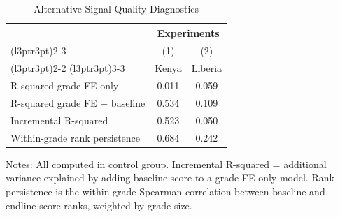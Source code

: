 \begin{table}[H]
\centering
\caption{Alternative Signal-Quality Diagnostics}
\label{tab:signal_quality_alt}
\begin{threeparttable}
\begin{tabular}[t]{lcc}
\toprule
\multicolumn{1}{c}{ } & \multicolumn{2}{c}{Experiments} \\
\cmidrule(l{3pt}r{3pt}){2-3}
\multicolumn{1}{c}{ } & \multicolumn{1}{c}{(1)} & \multicolumn{1}{c}{(2)} \\
\cmidrule(l{3pt}r{3pt}){2-2} \cmidrule(l{3pt}r{3pt}){3-3}
 & Kenya & Liberia \\
\midrule
R-squared grade FE only &  0.011 &  0.059 \\
R-squared grade FE + baseline &  0.534 &  0.109 \\
Incremental R-squared &  0.523 &  0.050 \\
Within-grade rank persistence &  0.684 &  0.242 \\
\bottomrule
\end{tabular}
\begin{tablenotes}[para]
\footnotesize
\item Notes: All computed in control group. Incremental R-squared = additional variance explained by adding baseline score to a grade FE only model. Rank persistence is the within grade Spearman correlation between baseline and endline score ranks, weighted by grade size.
\end{tablenotes}
\end{threeparttable}
\end{table}
